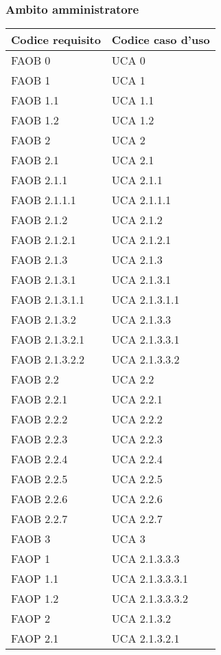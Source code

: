 \subsubsection{Ambito amministratore}
\begin{longtable}{p{} p{}}
\rowcolors{2}{light}{}
\textbf{Codice requisito} & \textbf{Codice caso d'uso}\\
\midrule
\midrule
FAOB 0 & UCA 0\\
\midrule
FAOB 1 & UCA 1\\
\midrule
FAOB 1.1 & UCA 1.1\\
\midrule
FAOB 1.2 & UCA 1.2\\
\midrule
FAOB 2 & UCA 2\\
\midrule
FAOB 2.1 & UCA 2.1\\
\midrule
FAOB 2.1.1 & UCA 2.1.1\\
\midrule
FAOB 2.1.1.1 & UCA 2.1.1.1\\
\midrule
FAOB 2.1.2 & UCA 2.1.2\\
\midrule
FAOB 2.1.2.1 & UCA 2.1.2.1\\
\midrule
FAOB 2.1.3 & UCA 2.1.3\\
\midrule
FAOB 2.1.3.1 & UCA 2.1.3.1\\
\midrule
FAOB 2.1.3.1.1 & UCA 2.1.3.1.1\\
\midrule
FAOB 2.1.3.2 & UCA 2.1.3.3\\
\midrule
FAOB 2.1.3.2.1 & UCA 2.1.3.3.1\\
\midrule
FAOB 2.1.3.2.2 & UCA 2.1.3.3.2\\
\midrule
FAOB 2.2 & UCA 2.2\\
\midrule
FAOB 2.2.1 & UCA 2.2.1\\
\midrule
FAOB 2.2.2 & UCA 2.2.2\\
\midrule
FAOB 2.2.3 & UCA 2.2.3\\
\midrule
FAOB 2.2.4 & UCA 2.2.4\\
\midrule
FAOB 2.2.5 & UCA 2.2.5\\
\midrule
FAOB 2.2.6 & UCA 2.2.6\\
\midrule
FAOB 2.2.7 & UCA 2.2.7\\
\midrule
FAOB 3 & UCA 3\\
\midrule
FAOP 1 & UCA 2.1.3.3.3\\
\midrule
FAOP 1.1 & UCA 2.1.3.3.3.1\\
\midrule
FAOP 1.2 & UCA 2.1.3.3.3.2\\
\midrule
FAOP 2 & UCA 2.1.3.2\\
\midrule
FAOP 2.1 & UCA 2.1.3.2.1\\

\end{longtable}